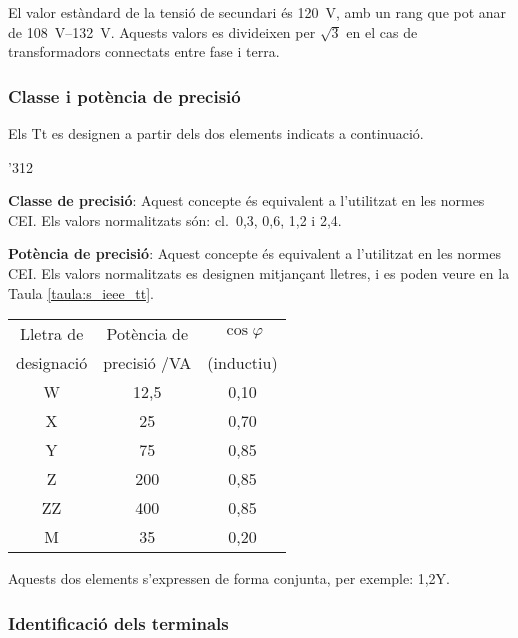 El valor estàndard de la tensió de
secundari és \SI{120}{V}, amb un rang  que pot anar de \SIrange{108}{132}{V}. Aquests valors es divideixen per $\sqrt{3}$ en el cas de transformadors connectats entre fase i terra.


\subsubsection{Classe i potència de precisió}

Els Tt es designen a partir dels dos
elements indicats a continuació.

\begin{dingautolist}{'312}
    \item \textbf{Classe de precisió}: Aquest concepte és equivalent
    a l'utilitzat en les normes CEI. Els valors
    normalitzats són: cl.~0,3, 0,6, 1,2 i 2,4.

    \item \textbf{Potència de precisió}: Aquest concepte és equivalent
    a l'utilitzat en les normes CEI. Els valors
    normalitzats es designen mitjançant lletres, i es poden veure en
    la Taula \vref{taula:s_ieee_tt}.
    
    \begin{center}
        \label{taula:s_ieee_tt}
        \begin{tabular}{ccc}
        \toprule[1pt]
        Lletra de & Potència de & $\cos\varphi$\\
        designació &  precisió /VA &  (inductiu)\\
        \midrule
        W & 12,5 & 0,10\\
        X & 25 & 0,70 \\
        Y & 75 & 0,85 \\
        Z & 200 & 0,85 \\
        ZZ & 400 & 0,85 \\
        M & 35 & 0,20 \\
        \bottomrule[1pt]
        \end{tabular}
    \end{center}
\end{dingautolist}

Aquests dos elements s'expressen de forma conjunta, per exemple:
1,2Y.

\subsubsection{Identificació dels terminals}


